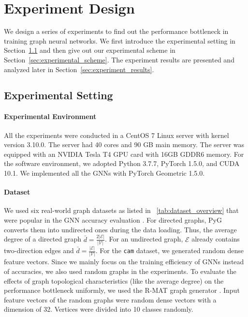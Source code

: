 \section{Experiment Design}
\label{sec:experimental_design}

We design a series of experiments to find out the performance bottleneck in training graph neural networks.
We first introduce the experimental setting in Section~\ref{sec:experimental_env} and then give out our experimental scheme in Section~\ref{sec:experimental_scheme}.
The experiment results are presented and analyzed later in Section~\ref{sec:experiment_results}.

\subsection{Experimental Setting}
\label{sec:experimental_env}

\paragraph{Experimental Environment}
All the experiments were conducted in a CentOS 7 Linux server with kernel version 3.10.0.
The server had 40 cores and 90 GB main memory.
The server was equipped with an NVIDIA Tesla T4 GPU card with 16GB GDDR6 memory.
For the software environment, we adopted Python 3.7.7, PyTorch 1.5.0, and CUDA 10.1.
We implemented all the GNNs with PyTorch Geometric 1.5.0.

\paragraph{Dataset}
We used six real-world graph datasets as listed in \tablename~\ref{tab:dataset_overview} that were popular in the GNN accuracy evaluation \cite{yang2016_revisiting_semisupervised, zeng2020_graphsaint, shchur2018_pitfall_of_gnn}.
For directed graphs, PyG converts them into undirected ones during the data loading.
Thus, the average degree of a directed graph $\bar{d}=\frac{2|\mathcal{E}|}{|\mathcal{V}|}$.
For an undirected graph, $\mathcal{E}$ already contains two-direction edges and $\bar{d}=\frac{|\mathcal{E}|}{|\mathcal{V}|}$.
For the \texttt{cam} dataset, we generated random dense feature vectors.
Since we mainly focus on the training efficiency of GNNs instead of accuracies, we also used random graphs in the experiments.
To evaluate the effects of graph topological characteristics (like the average degree) on the performance bottleneck uniformly, we used the R-MAT graph generator \cite{rmat-generator}.
Input feature vectors of the random graphs were random dense vectors with a dimension of 32.
Vertices were divided into 10 classes randomly.

